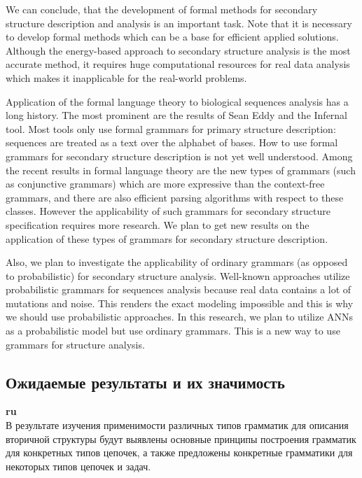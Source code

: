 \documentclass[12pt]{article}  %
\theoremstyle{remark}
\begin{document}
We can conclude, that the development of formal methods for secondary structure description and analysis is an important task.
Note that it is necessary to develop formal methods which can be a base for efficient applied solutions.
Although the energy-based approach to secondary structure analysis is the most accurate method, it requires huge computational resources for real data analysis which makes it inapplicable for the real-world problems.

Application of the formal language theory to biological sequences analysis has a long history. The most prominent are the results of Sean Eddy and the Infernal tool. Most tools only use formal grammars for primary structure description: sequences are treated as a text over the alphabet of bases.
How to use formal grammars for secondary structure description is not yet well understood.
Among the recent results in formal language theory are the new types of grammars (such as conjunctive grammars) which are more expressive than the context-free grammars, and there are also efficient parsing algorithms with respect to these classes.
However the applicability of such grammars for secondary structure specification requires more research.
We plan to get new results on the application of these types of grammars for secondary structure description.

Also, we plan to investigate the applicability of ordinary grammars (as opposed to probabilistic) for secondary structure analysis.
Well-known approaches utilize probabilistic grammars for sequences analysis because real data contains a lot of mutations and noise. This renders the exact modeling impossible and this is why we should use probabilistic approaches.
In this research, we plan to utilize ANNs as a probabilistic model but use ordinary grammars. This is a new way to use grammars for structure analysis.

\subsection{Ожидаемые результаты и их значимость}

\textbf{ru}\\
В результате изучения применимости различных типов грамматик для описания вторичной структуры будут выявлены основные принципы построения грамматик для конкретных типов цепочек, а также предложены конкретные грамматики для некоторых типов цепочек и задач.
\end{document}
